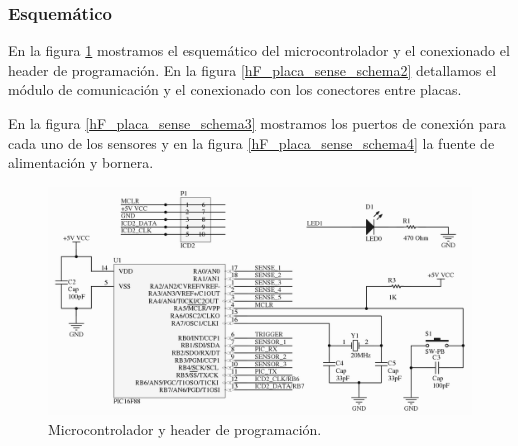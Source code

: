 \subsubsection{Esquem\'atico}
\label{h_placas_sensado_esquematico}

En la figura \ref{hF_placa_sense_schema} mostramos el esquem\'atico del microcontrolador y el conexionado
el header de programaci\'on.
En la figura \ref{hF_placa_sense_schema2} detallamos el m\'odulo de comunicaci\'on y el conexionado con
los conectores entre placas.

En la figura \ref{hF_placa_sense_schema3} mostramos los puertos de conexi\'on para cada uno de los sensores
y en la figura \ref{hF_placa_sense_schema4} la fuente de alimentaci\'on y bornera.

\begin{figure}
	\centering
	\includegraphics[scale=.22]{figuras/sense_schemaMicro.png}
	\caption{Microcontrolador y header de programaci\'on.}
	\label{hF_placa_sense_schema}
\end{figure}


